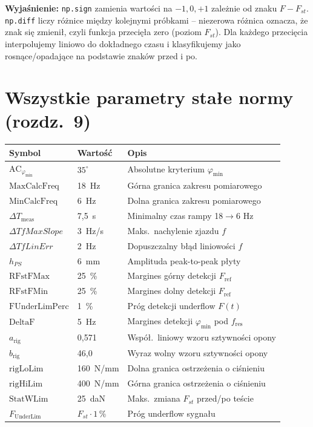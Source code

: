 \documentclass[11pt,a4paper]{article}
\theoremstyle{plainpol}
\begin{document}
\textbf{Wyjaśnienie:} \texttt{np.sign} zamienia wartości na $-1, 0, +1$
zależnie od znaku $F - F_{st}$. \texttt{np.diff} liczy różnice
między kolejnymi próbkami -- niezerowa różnica oznacza, że znak się
zmienił, czyli funkcja przecięła zero (poziom $F_{st}$). Dla każdego
przecięcia interpolujemy liniowo do dokładnego czasu i klasyfikujemy
jako rosnące/opadające na podstawie znaków przed i po.

\section{Wszystkie parametry stałe normy (rozdz.~9)}

\begin{center}
\begin{tabular}{lll}
\toprule
\textbf{Symbol} & \textbf{Wartość} & \textbf{Opis} \\
\midrule
$\mathrm{AC}_{\varphi_{\min}}$ & $35^\circ$ & Absolutne kryterium $\varphi_{\min}$ \\
$\mathrm{MaxCalcFreq}$  & 18~Hz   & Górna granica zakresu pomiarowego \\
$\mathrm{MinCalcFreq}$  & 6~Hz    & Dolna granica zakresu pomiarowego \\
$\Delta T_{\mathrm{meas}}$ & 7{,}5~s & Minimalny czas rampy 18$\to$6 Hz \\
$\Delta TfMaxSlope$     & 3~Hz/s  & Maks.~nachylenie zjazdu $f$ \\
$\Delta TfLinErr$       & 2~Hz    & Dopuszczalny błąd liniowości $f$ \\
$h_{PS}$                & 6~mm    & Amplituda peak-to-peak płyty \\
$\mathrm{RFstFMax}$     & 25~\%   & Margines górny detekcji $F_{\mathrm{ref}}$ \\
$\mathrm{RFstFMin}$     & 25~\%   & Margines dolny detekcji $F_{\mathrm{ref}}$ \\
$\mathrm{FUnderLimPerc}$ & 1~\%   & Próg detekcji underflow $F(t)$ \\
$\mathrm{DeltaF}$        & 5~Hz   & Margines detekcji $\varphi_{\min}$ pod $f_{\mathrm{res}}$ \\
$a_{\mathrm{rig}}$       & 0{,}571 & Współ.~liniowy wzoru sztywności opony \\
$b_{\mathrm{rig}}$       & 46{,}0  & Wyraz wolny wzoru sztywności opony \\
$\mathrm{rigLoLim}$      & 160~N/mm & Dolna granica ostrzeżenia o ciśnieniu \\
$\mathrm{rigHiLim}$      & 400~N/mm & Górna granica ostrzeżenia o ciśnieniu \\
$\mathrm{StatWLim}$      & 25~daN  & Maks.~zmiana $F_{st}$ przed/po teście \\
$F_{\mathrm{UnderLim}}$  & $F_{st}\cdot 1\,\%$ & Próg underflow sygnału \\
\bottomrule
\end{tabular}
\end{center}
\end{document}

